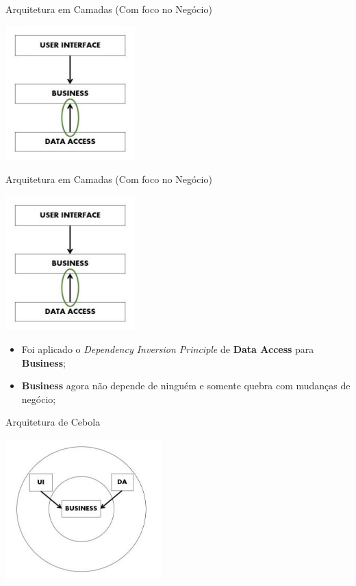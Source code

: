 \documentclass[aspectratio=169]{beamer}
\begin{document}
\begin{frame}{Arquitetura em Camadas (Com foco no Negócio)}			
	\begin{center}
		\includegraphics[width=5cm]{imgs/dip-layered-architecture}
	\end{center}
\end{frame}

\begin{frame}{Arquitetura em Camadas (Com foco no Negócio)}	
	\begin{multicols}{2}		
		\begin{center}
			\includegraphics[width=5cm]{imgs/dip-layered-architecture}
		\end{center}
		\begin{itemize}	
			\item Foi aplicado o \textit{Dependency Inversion Principle} de \textbf{Data Access} para \textbf{Business};
			\item \textbf{Business} agora não depende de ninguém e somente quebra com mudanças de negócio;
		\end{itemize}
	\end{multicols}
\end{frame}

\begin{frame}{Arquitetura de Cebola}			
	\begin{center}
		\includegraphics[width=6cm]{imgs/onion-architecture}
	\end{center}
\end{frame}
\end{document}
